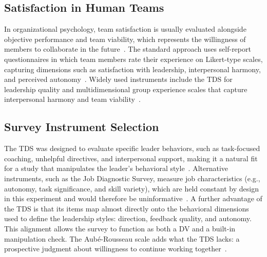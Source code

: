 \subsection{Satisfaction in Human Teams}
\label{subsec:satisfaction-human-teams}

In organizational psychology, team satisfaction is usually evaluated alongside objective performance and team viability, which represents the willingness of members to collaborate in the future~\cite{mathieu2017teamwork, auberousseau2005teamgoalcommitment}.
The standard approach uses self-report questionnaires in which team members rate their experience on Likert-type scales, capturing dimensions such as satisfaction with leadership, interpersonal harmony, and perceived autonomy~\cite{wageman2005teamdiagnosticsurvey, hackmanoldham1975jobdiagnostic, auberousseau2005teamgoalcommitment}.
Widely used instruments include the \ac{TDS} for leadership quality and multidimensional group experience scales that capture interpersonal harmony and team viability~\cite{wageman2005teamdiagnosticsurvey, auberousseau2005teamgoalcommitment}.

\subsection{Survey Instrument Selection}
\label{subsec:survey-instrument-selection}

The \ac{TDS} was designed to evaluate specific leader behaviors, such as task-focused coaching, unhelpful directives, and interpersonal support, making it a natural fit for a study that manipulates the leader's behavioral style~\cite{wageman2005teamdiagnosticsurvey}.
Alternative instruments, such as the Job Diagnostic Survey, measure job characteristics (e.g., autonomy, task significance, and skill variety), which are held constant by design in this experiment and would therefore be uninformative~\cite{hackmanoldham1975jobdiagnostic}.
A further advantage of the \ac{TDS} is that its items map almost directly onto the behavioral dimensions used to define the leadership styles: direction, feedback quality, and autonomy.
This alignment allows the survey to function as both a \ac{DV} and a built-in manipulation check.
The Aubé-Rousseau scale adds what the \ac{TDS} lacks: a prospective judgment about willingness to continue working together~\cite{auberousseau2005teamgoalcommitment}.

